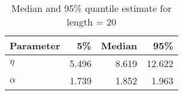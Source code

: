 \begin{table}[ht]
\centering
\begin{tabular}{lrrr}
  \hline
Parameter & 5\% & Median & 95\% \\ 
  \hline
$\eta$ & 5.496 & 8.619 & 12.622 \\ 
  $\alpha$ & 1.739 & 1.852 & 1.963 \\ 
   \hline
\end{tabular}
\caption{Median and 95\% quantile estimate for length = 20} 
\end{table}
